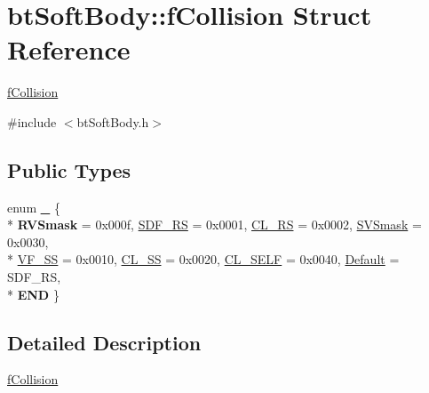 \hypertarget{structbt_soft_body_1_1f_collision}{\section{bt\+Soft\+Body\+:\+:f\+Collision Struct Reference}
\label{structbt_soft_body_1_1f_collision}
}


\hyperlink{structbt_soft_body_1_1f_collision}{f\+Collision}  




{\ttfamily \#include $<$bt\+Soft\+Body.\+h$>$}

\subsection*{Public Types}
\begin{DoxyCompactItemize}
\item 
enum \hyperlink{structbt_soft_body_1_1f_collision_afeb40bef0380b8db7e9e5628cc5f08d5}{\+\_\+} \{ \\*
{\bfseries R\+V\+Smask} = 0x000f, 
\hyperlink{structbt_soft_body_1_1f_collision_afeb40bef0380b8db7e9e5628cc5f08d5a7c057a9cdfcd280d9ec3bf69e09edc62}{S\+D\+F\+\_\+\+R\+S} = 0x0001, 
\hyperlink{structbt_soft_body_1_1f_collision_afeb40bef0380b8db7e9e5628cc5f08d5af9bbf62b0d36af93b1198eb19d800813}{C\+L\+\_\+\+R\+S} = 0x0002, 
\hyperlink{structbt_soft_body_1_1f_collision_afeb40bef0380b8db7e9e5628cc5f08d5a720d2ba3f15fb6ca5c417c5971eb05b6}{S\+V\+Smask} = 0x0030, 
\\*
\hyperlink{structbt_soft_body_1_1f_collision_afeb40bef0380b8db7e9e5628cc5f08d5a1ad696f1fa631c1256c18a3c8eb18ebc}{V\+F\+\_\+\+S\+S} = 0x0010, 
\hyperlink{structbt_soft_body_1_1f_collision_afeb40bef0380b8db7e9e5628cc5f08d5a602caf1ca49fea4d9215dbea6ad17f04}{C\+L\+\_\+\+S\+S} = 0x0020, 
\hyperlink{structbt_soft_body_1_1f_collision_afeb40bef0380b8db7e9e5628cc5f08d5a71505ee64a4a976707c73ec67cfcd533}{C\+L\+\_\+\+S\+E\+L\+F} = 0x0040, 
\hyperlink{structbt_soft_body_1_1f_collision_afeb40bef0380b8db7e9e5628cc5f08d5a1c6fb7a4f36642982c053815889133e5}{Default} = S\+D\+F\+\_\+\+R\+S, 
\\*
{\bfseries E\+N\+D}
 \}
\end{DoxyCompactItemize}


\subsection{Detailed Description}
\hyperlink{structbt_soft_body_1_1f_collision}{f\+Collision} 


